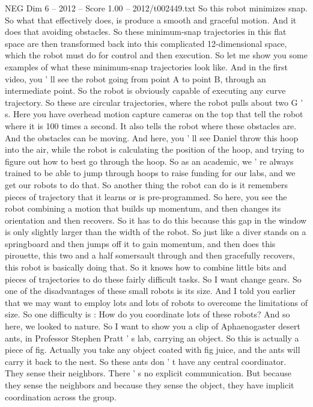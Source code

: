 \begin{textsample}{NEG Dim 6 – 2012 – Score 1.00 – 2012/t002449.txt}
So this robot minimizes snap.
So what that effectively does, is produce a smooth and graceful motion.
And it does that avoiding obstacles.
So these minimum-snap trajectories in this flat space are then transformed back into this complicated 12-dimensional space, which the robot must do for control and then execution.
So let me show you some examples of what these minimum-snap trajectories look like.
And in the first video, you ' ll see the robot going from point A to point B, through an intermediate point.
So the robot is obviously capable of executing any curve trajectory.
So these are circular trajectories, where the robot pulls about two G ' s.
Here you have overhead motion capture cameras on the top that tell the robot where it is 100 times a second.
It also tells the robot where these obstacles are.
And the obstacles can be moving.
And here, you ' ll see Daniel throw this hoop into the air, while the robot is calculating the position of the hoop, and trying to figure out how to best go through the hoop.
So as an academic, we ' re always trained to be able to jump through hoops to raise funding for our labs, and we get our robots to do that.
So another thing the robot can do is it remembers pieces of trajectory that it learns or is pre-programmed.
So here, you see the robot combining a motion that builds up momentum, and then changes its orientation and then recovers.
So it has to do this because this gap in the window is only slightly larger than the width of the robot.
So just like a diver stands on a springboard and then jumps off it to gain momentum, and then does this pirouette, this two and a half somersault through and then gracefully recovers, this robot is basically doing that.
So it knows how to combine little bits and pieces of trajectories to do these fairly difficult tasks.
So I want change gears.
So one of the disadvantages of these small robots is its size.
And I told you earlier that we may want to employ lots and lots of robots to overcome the limitations of size.
So one difficulty is : How do you coordinate lots of these robots?
And so here, we looked to nature.
So I want to show you a clip of Aphaenogaster desert ants, in Professor Stephen Pratt ' s lab, carrying an object.
So this is actually a piece of fig.
Actually you take any object coated with fig juice, and the ants will carry it back to the nest.
So these ants don ' t have any central coordinator.
They sense their neighbors.
There ' s no explicit communication.
But because they sense the neighbors and because they sense the object, they have implicit coordination across the group.

\end{textsample}
